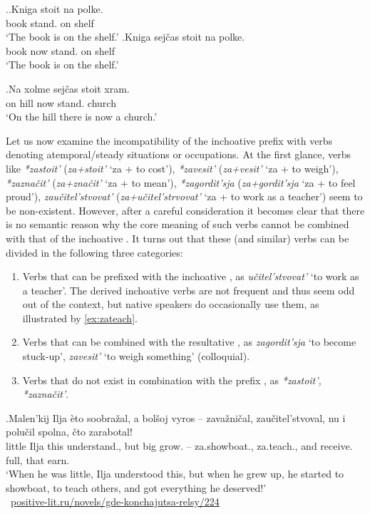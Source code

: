 \ex.\label{ex:stojat':kniga}\ag.Kniga stoit na polke.\\
book stand. on shelf\\
\trans `The book is on the shelf.'
\bg.Kniga sej\v{c}as stoit na polke.\\
book now stand. on shelf\\
\trans `The book is on the shelf.'

\exg.\label{ex:stojat':xram3}Na xolme sej\v{c}as stoit xram.\\
on hill now stand. church\\
\trans `On the hill there is now a church.'

Let us now examine the incompatibility of the inchoative prefix  with verbs denoting atemporal/steady situations or occupations. At the first glance, verbs like \textit{*zastoit'} (\textit{za+stoit'} `za + to cost'), \textit{*zavesit'} (\textit{za+vesit'} `za + to weigh'), \textit{*zazna\v{c}it'} (\textit{za+zna\v{c}it'} `za + to mean'), \textit{*zagordit'sja} (\textit{za+gordit'sja} `za + to feel proud'), \textit{zau\v{c}itel'stvovat'} (\textit{za+u\v{c}itel'strvovat'} `za + to work as a teacher') seem to be non-existent. However, after a careful consideration it becomes clear that there is no semantic reason why the core meaning of such verbs cannot be combined with that of the inchoative . It turns out that these (and similar) verbs can be divided in the following three categories:

\begin{enumerate}
\item Verbs that can be prefixed with the inchoative , as \textit{u\v{c}itel'stvovat'} `to work as a teacher'. The derived inchoative verbs are not frequent and thus seem odd out of the context, but native speakers do occasionally use them, as illustrated by \ref{ex:zateach}.
\item Verbs that can be combined with the resultative , as \textit{zagordit'sja} `to become stuck-up', \textit{zavesit'} `to weigh something' (colloquial).
\item Verbs that do not exist in combination with the prefix , as \textit{*zastoit', *zazna\v{c}it'}.
\end{enumerate}

\exg.\label{ex:zateach}Malen'kij Ilja \`{e}to soobra\v{z}al, a bol\v{s}oj vyros -- zava\v{z}ni\v{c}al, zau\v{c}itel'stvoval, {nu i} polu\v{c}il spolna, \v{c}to zarabotal!\\
little Ilja this understand., but big grow. -- za.showboat., za.teach., {and} receive. full, that earn.\\
\trans `When he was little, Ilja understood this, but when he grew up, he started to showboat, to teach others, and got everything he deserved!'\\\hbox{}\hfill\hbox{
\url{positive-lit.ru/novels/gde-konchajutsa-relsy/224}}

